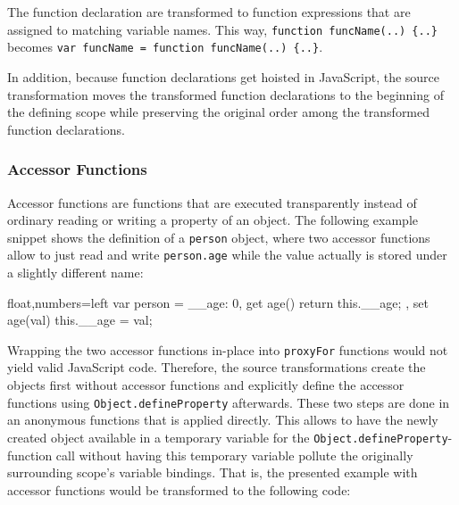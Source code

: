 
The function declaration are transformed to function expressions that are assigned to matching variable names.
This way, \lstinline|function funcName(..) {..}| becomes \lstinline|var funcName = function funcName(..) {..}|.

In addition, because function declarations get hoisted in JavaScript, the source transformation moves the transformed function declarations to the beginning of the defining scope while preserving the original order among the transformed function declarations.


\subsubsection{Accessor Functions}

Accessor functions are functions that are executed transparently instead of ordinary reading or writing a property of an object.
The following example snippet shows the definition of a \lstinline{person} object, where two accessor functions allow to just read and write \lstinline{person.age} while the value actually is stored under a slightly different name:

\begin{code}{}{float,numbers=left}
var person = {
    __age: 0,
    get age() {
        return this.__age;
    },
    set age(val) {
        this.__age = val;
    }
}
\end{code}
\iffalse
\end{verbatim}\fi

Wrapping the two accessor functions in-place into \lstinline{proxyFor} functions would not yield valid JavaScript code.
Therefore, the source transformations create the objects first without accessor functions and explicitly define the accessor functions using \lstinline{Object.defineProperty} afterwards.
These two steps are done in an anonymous functions that is applied directly.
This allows to have the newly created object available in a temporary variable for the \lstinline{Object.defineProperty}-function call without having this temporary variable pollute the originally surrounding scope's variable bindings.
That is, the presented example with accessor functions would be transformed to the following code: \\

